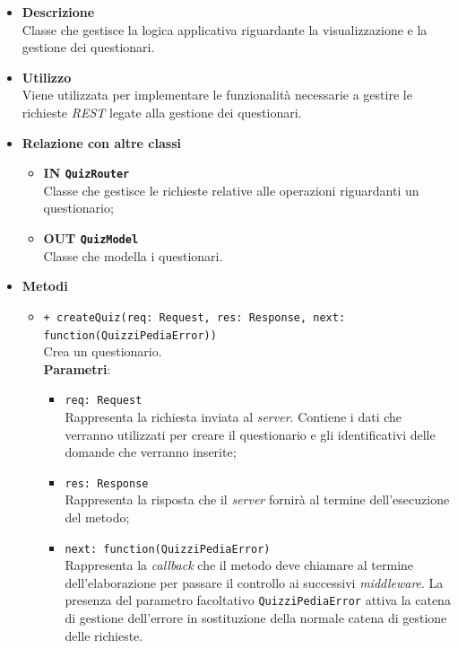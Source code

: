 \begin{itemize}
	\item \textbf{Descrizione} \\
	Classe che gestisce la logica applicativa riguardante la visualizzazione e la gestione dei questionari.
	\item \textbf{Utilizzo} \\
	Viene utilizzata per implementare le funzionalità necessarie a gestire le richieste \textit{REST} legate alla gestione dei questionari.
	\item \textbf{Relazione con altre classi}\\
	\begin{itemize}
			\item \textbf{IN \texttt{QuizRouter}}\\
			Classe che gestisce le richieste relative alle operazioni riguardanti un questionario;
			\item \textbf{OUT \texttt{QuizModel}} \\
			Classe che modella i questionari.
	\end{itemize}
	\item \textbf{Metodi}\\
	\begin{itemize}
		\item \texttt{+ createQuiz(req: Request, res: Response, next: function(QuizziPediaError))}\\
		Crea un questionario.\\
		\textbf{Parametri}:
		\begin{itemize}
			\item \texttt{req: Request}\\
			Rappresenta la richiesta inviata al \textit{server}. Contiene i dati che verranno utilizzati per creare il questionario e gli identificativi delle domande che verranno inserite;
			\item \texttt{res: Response}\\
			Rappresenta la risposta che il \textit{server} fornirà al termine dell'esecuzione del metodo;
			\item \texttt{next: function(QuizziPediaError)}\\
			Rappresenta la \textit{callback} che il metodo deve chiamare al termine dell'elaborazione per passare il controllo ai successivi \textit{middleware}. La presenza del parametro facoltativo \texttt{QuizziPediaError} attiva la catena di gestione dell'errore in sostituzione della normale catena di gestione delle richieste.
		\end{itemize}
	

\end{itemize}
\end{itemize}
